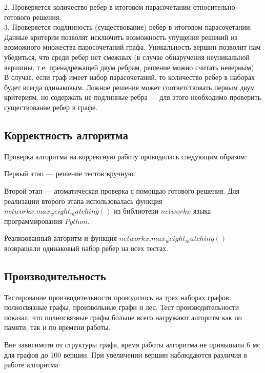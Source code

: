 \documentclass[14pt, a4paper]{extarticle}
\begin{document}
    2. Проверяется количество ребер в итоговом парасочетании относительно готового решения.\\

    3. Проверяется подлинность (существование) ребер в итоговом парасочетании.\\

    Данные критерии позволят исключить возможность упущения решений из возможного множества паросочетаний графа. Уникальность вершин позволит нам убедиться, что среди ребер нет смежных (в случае обнаручения неуникальной вершины, т.е. пренадрежащей двум ребрам, решение можно считать неверным). В случае, если граф имеет набор парасочетаний, то количество ребер в наборах будет всегда одинаковым. Ложное решение может соответствовать первым двум критериям, но содержать не подлинные ребра --- для этого необходимо проверить существование ребер в графе.
    \pagebreak

    \subsection*{Корректность алгоритма}

    Проверка алгоритма на корректную работу проводилась следующим образом:

    Первый этап --- решение тестов вручную.

    Второй этап --- атоматическая проверка с помощью готового решения. 
    Для реализации второго этапа использовалась функция $networkx.max_weight_matching()$ из библиотеки $networkx$ языка программирования $Python$.

    Реализованный алгоритм и функция $networkx.max_weight_matching()$ возвращали одинаковый набор ребер на всех тестах.

    \subsection*{Производительность}

    Тестирование производительности проводилось на трех наборах графов: полносвязные графы, произвольные графи и лес. Тест производительности показал, что полносвязные графы больше всего нагружают алгоритм как по памяти, так и по времени работы.

    Вне зависимоти от структуры графа, время работы алгоритма не привышала 6 мс для графов до 100 вершин. При увеличении вершин наблюдаются различия в работе алгоритма:
    
\end{document}

